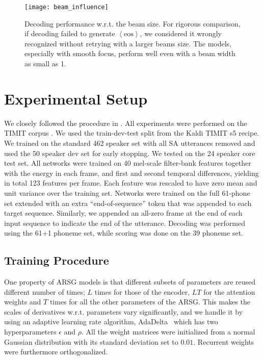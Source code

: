 \documentclass{article}
\begin{document}
\begin{figure}[t]
  \centering
  \texttt{[image: beam\_influence]}
\caption{Decoding performance w.r.t. the beam size.
For rigorous comparison, if decoding failed to generate
      $\left<\text{eos}\right>$, we considered it wrongly recognized without
      retrying with a larger beams size. The models, especially with smooth focus, 
      perform well even
      with a beam width as small as 1.
}
  \label{fig:beam_dependency}

  \vspace{-4mm}
\end{figure}

\section{Experimental Setup}
\label{sec:setup}

We closely followed the procedure in \cite{graves_2013_timit}. All experiments
were performed on the TIMIT corpus \cite{timit}. We used the train-dev-test
split from the Kaldi \cite{povey_2011} TIMIT s5 recipe. We trained on the
standard 462 speaker set with all SA utterances removed and used the 50 speaker
dev set for early stopping. We tested on the 24 speaker core test set. All
networks were trained on 40 mel-scale filter-bank features together with the
energy in each frame, and first and second temporal differences, yielding in
total 123 features per frame. Each feature was rescaled to have zero mean and
unit variance over the training set. Networks were trained on the full 61-phone
set extended with an extra ``end-of-sequence'' token that was appended to each
target sequence. Similarly, we appended an all-zero frame at the end of each
input sequence to indicate the end of the utterance. Decoding was performed
using the 61+1 phoneme set, while scoring was done on the 39 phoneme set.

\subsection{Training Procedure}

One property of ARSG models is that different subsets of parameters are reused
different number of times; $L$ times for those of the encoder, $LT$ for the
attention weights and $T$ times for all the other parameters of the ARSG.  This
makes the scales of derivatives w.r.t. parameters vary significantly, and we
handle it by using an adaptive learning rate algorithm,
AdaDelta~\cite{zeiler_2012} which has two hyperparameters $\epsilon$ and $\rho$.
All the weight matrices were initialized from a normal Gaussian distribution
with its standard deviation set to $0.01$. Recurrent weights were furthermore
orthogonalized.
\end{document}
